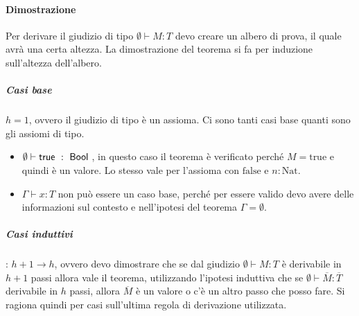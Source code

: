 \paragraph{Dimostrazione}

Per derivare il giudizio di tipo $\emptyset \vdash M : T$ devo creare un albero di prova, il quale avrà una certa altezza. La dimostrazione del teorema si fa per induzione sull'altezza dell'albero.

\subparagraph{Casi base} $h = 1$, ovvero il giudizio di tipo è un assioma. Ci sono tanti casi base quanti sono gli assiomi di tipo.

\begin{itemize}
	\item $\emptyset \vdash \text{true } : \Bool$, in questo caso il teorema è verificato perché $M = \text{true}$ e quindi è un valore. Lo stesso vale per l'assioma con $\text{false}$ e $n :\text{Nat}$.
	\item $\Gamma \vdash x : T$ non può essere un caso base, perché per essere valido devo avere delle informazioni sul contesto e nell'ipotesi del teorema $\Gamma = \emptyset$.
\end{itemize} 

\subparagraph{Casi induttivi}: $h+1 \rightarrow h$, ovvero devo dimostrare che se dal giudizio $\emptyset \vdash M : T$ è derivabile in $h+1$ passi allora vale il teorema, utilizzando l'ipotesi induttiva che se $\emptyset \vdash \overline{M} : \overline{T}$ derivabile in $h$ passi, allora $\overline{M}$ è un valore o c'è un altro passo che posso fare.
Si ragiona quindi per casi sull'ultima regola di derivazione utilizzata.

